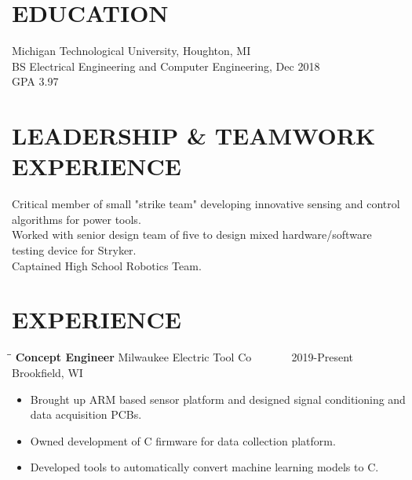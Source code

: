 \documentclass[letterpaper]{res}
\begin{document}
 


\address{\bf CONTACT \\ jaevanko@mtu.edu \\ (269) 262-6098}
\address{\bf ADDRESS \\ 405 Bishops Way, Apt 308 \\ Brookfield, WI 53005}

\begin{resume}


  \section{EDUCATION}          
  Michigan Technological University, Houghton, MI  \\        
  BS Electrical Engineering and Computer Engineering, Dec 2018   \\      
  GPA 3.97

  \section{LEADERSHIP \& TEAMWORK EXPERIENCE}
  Critical member of small "strike team" developing innovative sensing and control algorithms for power tools. \\
  Worked with senior design team of five to design mixed hardware/software testing device for Stryker. \\
  Captained High School Robotics Team. \\

  \section{EXPERIENCE}
  \vspace{-0.15in}
  \begin{tabbing}
    \hspace{2.3in}\= \hspace{2.6in}\= \kill %
    {\bf Concept Engineer} \>Milwaukee Electric Tool Co \> ~~~~~~ 2019-Present \\
    \> Brookfield, WI
  \end{tabbing}\vspace{-10pt}
  \begin{itemize} \itemsep1pt \parskip0pt 
    \item Brought up ARM based sensor platform and designed signal conditioning and data acquisition PCBs.
    \item Owned development of C firmware for data collection platform.
    \item Developed tools to automatically convert machine learning models to C.
  \end{itemize}


\end{resume}
\end{document}
